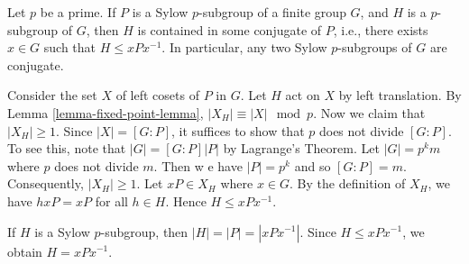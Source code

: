 \begin{theorem} \label{thm-second-sylow-thm}
	Let $p$ be a prime. If $P$ is a Sylow $p$-subgroup of a finite group $G$, and $H$ is a $p$-subgroup of $G$, then $H$ is contained in some conjugate of $P$, i.e., there exists $x\in G$ such that $H\leq xPx^{-1}$. In particular, any two Sylow $p$-subgroups of $G$ are conjugate.
\end{theorem}
\begin{sketch}
	Consider the set $X$ of left cosets of $P$ in $G$. Let $H$ act on $X$ by left translation. By Lemma \ref{lemma-fixed-point-lemma}, $|X_H|\equiv |X| \mod p$. Now we claim that $|X_H|\geq 1$. Since $|X| = [G:P]$, it suffices to show that $p$ does not divide $[G:P]$. To see this, note that $|G| = [G:P]|P|$ by Lagrange's Theorem. Let $|G| = p^k m$ where $p$ does not divide $m$. Then w e have $|P| = p^k$ and so $[G:P] = m$. Consequently, $|X_H|\geq 1$. Let $xP\in X_H$ where $x\in G$. By the definition of $X_H$, we have
$hxP = xP$ for all $h\in H$. Hence $H\leq xPx^{-1}$.

If $H$ is a Sylow $p$-subgroup, then $|H| = |P| = |xPx^{-1}|$. Since $H\leq xPx^{-1}$, we obtain $H = xPx^{-1}$.
\end{sketch}

